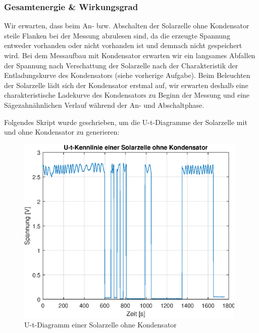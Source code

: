 \clearpage
\subsubsection{Gesamtenergie \& Wirkungsgrad}


Wir erwarten, dass beim An- bzw. Abschalten der Solarzelle ohne Kondensator steile Flanken bei der Messung abzulesen sind, da die erzeugte Spannung entweder vorhanden oder nicht vorhanden ist und demnach nicht gespeichert wird.
Bei dem Messaufbau mit Kondensator erwarten wir ein langsames Abfallen der Spannung nach Verschattung der Solarzelle nach der Charakteristik der Entladungskurve des Kondensators (siehe vorherige Aufgabe). Beim Beleuchten der Solarzelle lädt sich der Kondensator erstmal auf, wir erwarten deshalb eine charakteristische Ladekurve des Kondensators zu Beginn der Messung und eine Sägezahnähnlichen Verlauf während der An- und Abschaltphase.

Folgendes Skript wurde geschrieben, um die U-t-Diagramme der Solarzelle mit und ohne Kondensator zu generieren:


\clearpage
{}

\begin{figure}[htb]
\centering
\includegraphics[width=11cm]{pictures/Vergleich/ohne-Kondensator.eps}
\caption{U-t-Diagramm einer Solarzelle ohne Kondensator}
\label{fig:ohne-Kondensator}
\end{figure}

